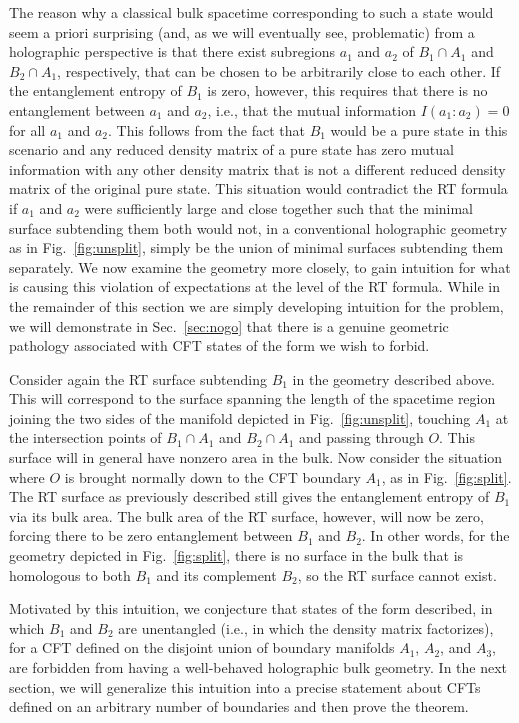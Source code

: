 \documentclass[12pt,english]{article}
\newcommand{\Fig}[1]{Fig.~\ref{#1}}
\newcommand{\Sec}[1]{Sec.~\ref{#1}}
\begin{document}
The reason why a classical bulk spacetime corresponding to such a state would seem a priori surprising (and, as we will eventually see, problematic) from a holographic perspective is that there exist subregions $a_1$ and $a_2$ of $B_1 \cap A_1$ and $B_2 \cap A_1$, respectively, that can be chosen to be arbitrarily close to each other. If the entanglement entropy of $B_1$ is zero, however, this requires that there is no entanglement between $a_1$ and $a_2$, i.e., that the mutual information $I(a_1:a_2)=0$ for all $a_1$ and $a_2$. This follows from the fact that $B_1$ would be a pure state in this scenario and any reduced density matrix of a pure state has zero mutual information with any other density matrix that is not a different reduced density matrix of the original pure state. This situation would contradict the RT formula if $a_1$ and $a_2$ were sufficiently large and close together such that  the minimal surface subtending them both would not, in a conventional holographic geometry as in \Fig{fig:unsplit}, simply be the union of minimal surfaces subtending them separately. We now examine the geometry more closely, to gain intuition for what is causing this violation of expectations at the level of the RT formula. While in the remainder of this section we are simply developing intuition for the problem, we will demonstrate in \Sec{sec:nogo} that there is a genuine geometric pathology associated with CFT states of the form we wish to forbid.

Consider again the RT surface subtending $B_1$ in the geometry described above. This will correspond to the surface spanning the length of the spacetime region joining the two sides of the manifold depicted in \Fig{fig:unsplit}, touching $A_1$ at the intersection points of $B_1 \cap A_1$ and $B_2 \cap A_1$ and passing through $O$. This surface will in general have nonzero area in the bulk. Now consider the situation where $O$ is brought normally down to the CFT boundary $A_1$, as in \Fig{fig:split}. The RT surface as previously described still gives the entanglement entropy of $B_1$ via its bulk area. The bulk area of the RT surface, however, will now be zero, forcing there to be zero entanglement between $B_1$ and $B_2$. In other words, for the geometry depicted in \Fig{fig:split}, there is no surface in the bulk that is homologous to both $B_1$ and its complement $B_2$, so the RT surface cannot exist.

Motivated by this intuition, we conjecture that states of the form described, in which $B_1$ and $B_2$ are unentangled (i.e., in which the density matrix factorizes), for a CFT defined on the disjoint union of boundary manifolds $A_1$, $A_2$, and $A_3$, are forbidden from having a well-behaved holographic bulk geometry. In the next section, we will generalize this intuition into a precise statement about CFTs defined on an arbitrary number of boundaries and then prove the theorem.
\end{document}
